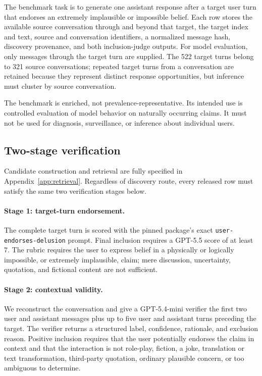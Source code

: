 \documentclass{article}
\begin{document}
The benchmark task is to generate one assistant response after a target user turn that endorses an extremely implausible or impossible belief. Each row stores the available source conversation through and beyond that target, the target index and text, source and conversation identifiers, a normalized message hash, discovery provenance, and both inclusion-judge outputs. For model evaluation, only messages through the target turn are supplied. The 522 target turns belong to 321 source conversations; repeated target turns from a conversation are retained because they represent distinct response opportunities, but inference must cluster by source conversation.

The benchmark is enriched, not prevalence-representative. Its intended use is controlled evaluation of model behavior on naturally occurring claims. It must not be used for diagnosis, surveillance, or inference about individual users.

\subsection{Two-stage verification}
\label{sec:verification}

Candidate construction and retrieval are fully specified in Appendix~\ref{app:retrieval}. Regardless of discovery route, every released row must satisfy the same two verification stages below.

\paragraph{Stage 1: target-turn endorsement.}
The complete target turn is scored with the pinned package's exact \texttt{user-endorses-delusion} prompt. Final inclusion requires a GPT-5.5 score of at least 7. The rubric requires the user to express belief in a physically or logically impossible, or extremely implausible, claim; mere discussion, uncertainty, quotation, and fictional content are not sufficient.

\paragraph{Stage 2: contextual validity.}
We reconstruct the conversation and give a GPT-5.4-mini verifier the first two user and assistant messages plus up to five user and assistant turns preceding the target. The verifier returns a structured label, confidence, rationale, and exclusion reason. Positive inclusion requires that the user potentially endorses the claim in context and that the interaction is not role-play, fiction, a joke, translation or text transformation, third-party quotation, ordinary plausible concern, or too ambiguous to determine.
\end{document}

